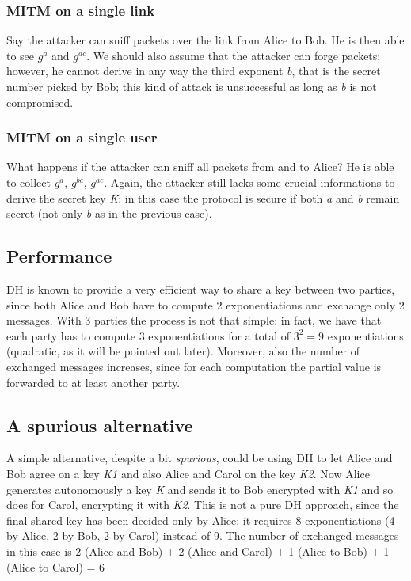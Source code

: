\documentclass[11 pt]{article}
\begin{document}
\subsubsection{MITM on a single link}
Say the attacker can sniff packets over the link from Alice to Bob. He is then able to see $g^a$ and $g^{ac}$. We should also assume that the attacker can forge packets; however, he cannot derive in any way the third exponent \textit{b}, that is the secret number picked by Bob; this kind of attack is unsuccessful as long as \textit{b} is not compromised.
\subsubsection{MITM on a single user}
What happens if the attacker can sniff all packets from and to Alice? He is able to collect $g^a$, $g^{bc}$, $g^{ac}$. Again, the attacker still lacks some crucial informations to derive the secret key \textit{K}: in this case the protocol is secure if both \textit{a} and \textit{b} remain secret (not only \textit{b} as in the previous case).  

\subsection{Performance}
\label{sec:3-performance}
DH is known to provide a very efficient way to share a key between two parties, since both Alice and Bob have to compute 2 exponentiations and exchange only 2 messages. With 3 parties the process is not that simple: in fact, we have that each party has to compute 3 exponentiations for a total of $3^2 = 9$ exponentiations (quadratic, as it will be pointed out later). Moreover, also the number of exchanged messages increases, since for each computation the partial value is forwarded to at least another party.

\subsection{A spurious alternative}
A simple alternative, despite a bit \textit{spurious}, could be using DH to let Alice and Bob agree on a key \textit{K1} and also Alice and Carol on the key \textit{K2}. Now Alice generates autonomously a key \textit{K} and sends it to Bob encrypted with \textit{K1} and so does for Carol, encrypting it with \textit{K2}. This is not a pure DH approach, since the final shared key has been decided only by Alice: it requires 8 exponentiations (4 by Alice, 2 by Bob, 2 by Carol) instead of 9. The number of exchanged messages in this case is 2 (Alice and Bob) + 2 (Alice and Carol) + 1 (Alice to Bob) + 1 (Alice to Carol) = 6
\end{document}
